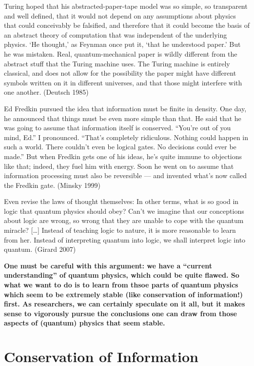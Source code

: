 \documentclass[12pt]{article}
\newcommand{\jc}[1]{\fbox{Jacques says:} \textbf{#1}}
\begin{document}
Turing hoped that his abstracted-paper-tape model was so simple, so
transparent and well defined, that it would not depend on any
assumptions about physics that could conceivably be falsified, and
therefore that it could become the basis of an abstract theory of
computation that was independent of the underlying physics. ‘He
thought,’ as Feynman once put it, ‘that he understood paper.’ But he
was mistaken. Real, quantum-mechanical paper is wildly different from
the abstract stuff that the Turing machine uses. The Turing machine is
entirely classical, and does not allow for the possibility the paper
might have different symbols written on it in different universes, and
that those might interfere with one another.  (Deutsch 1985)

Ed Fredkin pursued the idea that information must be finite in
density. One day, he announced that things must be even more simple
than that. He said that he was going to assume that information itself
is conserved. ``You’re out of you mind, Ed.'' I pronounced. ``That’s
completely ridiculous. Nothing could happen in such a world. There
couldn’t even be logical gates. No decisions could ever be made.'' But
when Fredkin gets one of his ideas, he’s quite immune to objections
like that; indeed, they fuel him with energy. Soon he went on to
assume that information processing must also be reversible — and
invented what’s now called the Fredkin gate. (Minsky 1999)

Even revise the laws of thought themselves: In other terms, what is so
good in logic that quantum physics should obey? Can't we imagine that
our conceptions about logic are wrong, so wrong that they are unable
to cope with the quantum miracle? […] Instead of teaching logic to
nature, it is more reasonable to learn from her. Instead of
interpreting quantum into logic, we shall interpret logic into
quantum. (Girard 2007)

\jc{One must be careful with this argument: we have a ``current 
understanding'' of quantum physics, which could be quite flawed.
So what we want to do is to learn from thsoe parts of quantum physics
which seem to be extremely stable (like conservation of information!)
first. As researchers, we can certainly speculate on it all, but it
makes sense to vigorously pursue the conclusions one can draw from
those aspects of (quantum) physics that seem stable.}

\section{Conservation of Information}
\end{document}
